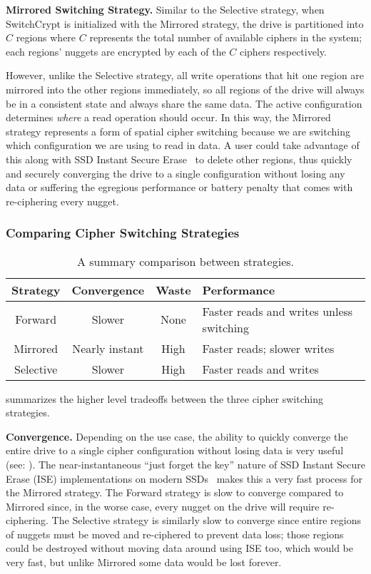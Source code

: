 \textbf{Mirrored Switching Strategy.} Similar to the Selective strategy, when
SwitchCrypt is initialized with the Mirrored strategy, the drive is partitioned
into $C$ regions where $C$ represents the total number of available ciphers in
the system; each regions' nuggets are encrypted by each of the $C$ ciphers
respectively.

However, unlike the Selective strategy, all write operations that hit one region
are mirrored into the other regions immediately, so all regions of the drive
will always be in a consistent state and always share the same data. The active
configuration determines \emph{where} a read operation should occur. In this
way, the Mirrored strategy represents a form of spatial cipher switching because
we are switching which configuration we are using to read in data. A user could
take advantage of this along with SSD Instant Secure Erase~\cite{ISE1,ISE2,ISE3}
to delete other regions, thus quickly and securely converging the drive to a
single configuration without losing any data or suffering the egregious
performance or battery penalty that comes with re-ciphering every nugget.

\subsubsection{Comparing Cipher Switching Strategies}

\begin{table}[ht]
   \begin{tabular}{@{}|c|c|c|C{25mm}|@{}}
      \toprule
      \textbf{Strategy} & \textbf{Convergence} & \textbf{Waste} &
      \textbf{Performance} \\
      \midrule
      Forward   & Slower       & None & Faster reads and writes unless switching
      \\\hline
      Mirrored  & Nearly instant & High & Faster reads; slower writes \\
      \hline
      Selective & Slower       & High & Faster reads and writes  \\
      \hline
   \end{tabular}
   \caption{A summary comparison between strategies.}
   \label{tbl:strategies-advantages}
\end{table}

 summarizes the higher level tradeoffs between the
three cipher switching strategies.

\textbf{Convergence.} Depending on the use case, the ability to quickly converge
the entire drive to a single cipher configuration without losing data is very
useful (see: ). The near-instantaneous ``just forget the key''
nature of SSD Instant Secure Erase (ISE) implementations on modern
SSDs~\cite{ISE1,ISE2,ISE3} makes this a very fast process for the Mirrored
strategy. The Forward strategy is slow to converge compared to Mirrored since,
in the worse case, every nugget on the drive will require re-ciphering. The
Selective strategy is similarly slow to converge since entire regions of nuggets
must be moved and re-ciphered to prevent data loss; those regions could be
destroyed without moving data around using ISE too, which would be very fast,
but unlike Mirrored some data would be lost forever.

